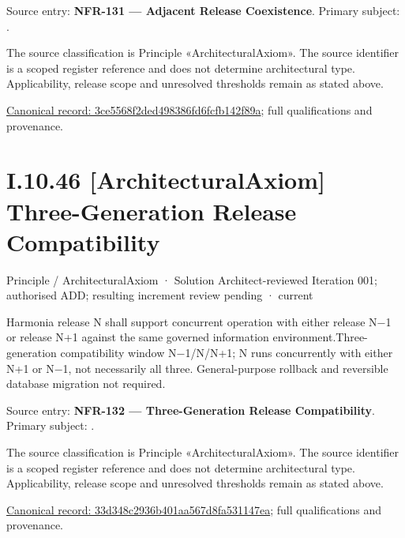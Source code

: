 Source entry: \textbf{NFR-131 — Adjacent Release Coexistence}. Primary subject: \texttt{}.



The source classification is Principle «ArchitecturalAxiom». The source identifier is a scoped register reference and does not determine architectural type. Applicability, release scope and unresolved thresholds remain as stated above.


{\footnotesize \href{../../../../../../../continuum/motivation/principle/architectural-axiom/3ce5568f2ded498386fd6fcfb142f89a.md}{Canonical record: 3ce5568f2ded498386fd6fcfb142f89a}; full qualifications and provenance.}\par
\section*{I.10.46 [ArchitecturalAxiom] Three-Generation Release Compatibility}
\label{navigation:I.10.46}

\label{element:33d348c2936b401aa567d8fa531147ea}
{\small Principle / ArchitecturalAxiom · Solution Architect-reviewed Iteration 001; authorised ADD; resulting increment review pending · current}\par

Harmonia release N shall support concurrent operation with either release N−1 or release N+1 against the same governed information environment.Three-generation compatibility window N−1/N/N+1; N runs concurrently with either N+1 or N−1, not necessarily all three. General-purpose rollback and reversible database migration not required.



Source entry: \textbf{NFR-132 — Three-Generation Release Compatibility}. Primary subject: \texttt{}.



The source classification is Principle «ArchitecturalAxiom». The source identifier is a scoped register reference and does not determine architectural type. Applicability, release scope and unresolved thresholds remain as stated above.


{\footnotesize \href{../../../../../../../continuum/motivation/principle/architectural-axiom/33d348c2936b401aa567d8fa531147ea.md}{Canonical record: 33d348c2936b401aa567d8fa531147ea}; full qualifications and provenance.}\par
